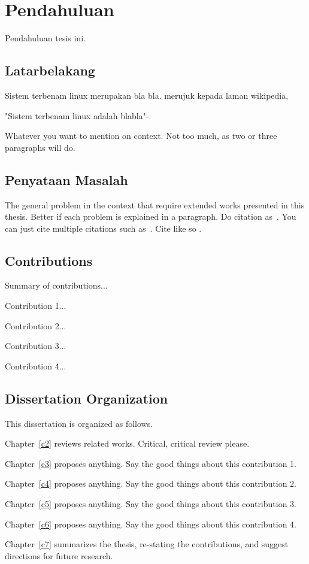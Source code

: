 \chapter{Pendahuluan}\label{c1}%
Pendahuluan tesis ini.

\section{Latarbelakang}
Sistem terbenam linux merupakan bla bla. merujuk kepada laman wikipedia,

"Sistem terbenam linux adalah blabla"-\cite{w2}.

Whatever you want to mention on context. Not too much, as two or
three paragraphs will do.

\section{Penyataan Masalah}
The general problem in the context that require extended works
presented in this thesis. Better if each problem is explained in a
paragraph. Do citation as~\cite{b1}. You can just cite multiple
citations such as~\cite{j1, c1, w1}. Cite like so \cite{b1}.

\section{Contributions}
Summary of contributions...

Contribution 1...

Contribution 2...

Contribution 3...

Contribution 4...

\section{Dissertation Organization}
This dissertation is organized as follows.

Chapter~\ref{c2} reviews related works. Critical, critical review
please.

Chapter~\ref{c3} proposes anything. Say the good things about this
contribution 1.

Chapter~\ref{c4} proposes anything. Say the good things about this
contribution 2.

Chapter~\ref{c5} proposes anything. Say the good things about this
contribution 3.

Chapter~\ref{c6} proposes anything. Say the good things about this
contribution 4.

Chapter~\ref{c7} summarizes the thesis, re-stating the
contributions, and suggest directions for future research.
